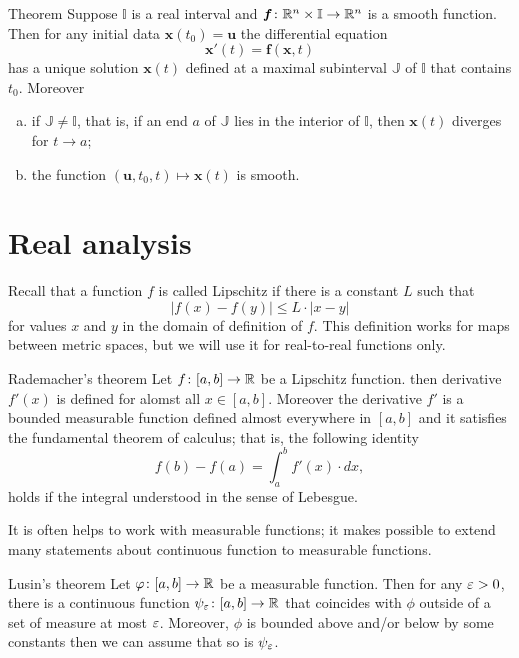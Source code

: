 \begin{thm}{Theorem}\label{thm:ODE}
Suppose $\mathbb{I}$ is a real interval and $\bm{f}\colon\mathbb{R}^n\times\mathbb{I}\to \mathbb{R}^n$ is a smooth function.
Then for any initial data $\bm{x}(t_0)=\bm{u}$ the differential equation 
\[\bm{x}'(t)=\bm{f}(\bm{x},t)\]
has a unique solution $\bm{x}(t)$ defined at a maximal subinterval $\mathbb{J}$ of $\mathbb{I}$ that contains $t_0$.
Moreover
\begin{enumerate}[(a)]
\item  if $\mathbb{J}\ne \mathbb{I}$, that is, if an end $a$ of $\mathbb{J}$ lies in the interior of $\mathbb{I}$, then $\bm{x}(t)$ diverges for $t\to a$;
\item  the function $(\bm{u},t_0,t)\mapsto \bm{x}(t)$ is smooth.
\end{enumerate}


\end{thm}

\section*{Real analysis}

Recall that a function $f$ is called Lipschitz if there is a constant $L$ such that 
\[|f(x)-f(y)|\le L\cdot|x-y|\]
for values $x$ and $y$ in the domain of definition of $f$.
This definition works for maps between metric spaces, but we will use it for real-to-real functions only.

\begin{thm}{Rademacher's theorem}\label{thm:rademacher}
Let $f\colon[a,b]\to\mathbb{R}$ be a Lipschitz function.
then derivative $f'(x)$ is defined for alomst all $x\in [a,b]$.
Moreover the derivative $f'$ is a bounded measurable function defined almost everywhere in $[a,b]$ and it satisfies the fundamental theorem of calculus; that is, the following identity 
\[f(b)-f(a)=\int_a^b f'(x)\cdot dx,\]
holds if the integral understood in the sense of Lebesgue.
\end{thm}

It is often helps to work with measurable functions; 
it makes possible to extend many statements about continuous function to measurable functions.

\begin{thm}{Lusin's theorem}\label{thm:lusin}
Let $\varphi\colon[a,b]\to \mathbb{R}$ be a measurable function.
Then for any $\varepsilon>0$, there is a continuous function $\psi_\varepsilon\colon[a,b]\to \mathbb{R}$ that coincides with $\phi$ outside of a set of measure at most $\varepsilon$.
Moreover, $\phi$ is bounded above and/or below by some constants then we can assume that so is $\psi_\varepsilon$.  
\end{thm}

